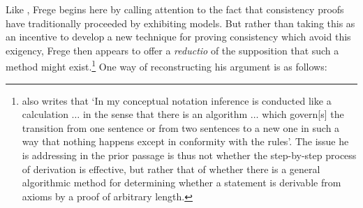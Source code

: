 \documentclass[11pt,fleqn,leqno]{article}
\begin{document}
Like \citet{Hilbert1900}, Frege begins here by calling attention to the fact that consistency proofs have traditionally proceeded by exhibiting models.  But rather than taking this as an incentive to develop a new technique for proving consistency which avoid this exigency, Frege then appears to offer a \textsl{reductio} of the supposition that such a method might exist.\footnote{\citet[p. 237]{Frege1897} also writes that `In my conceptual notation inference is conducted like a calculation $\ldots$ in the sense that there is an algorithm $\ldots$ which govern[s] the transition from one sentence or from two sentences to a new one in such a way that nothing happens except in conformity with the rules'.   The issue he is addressing in the prior passage is thus not whether the step-by-step process of derivation is effective, but rather that of whether there is a general algorithmic method for determining whether a statement is derivable from axioms by a proof of arbitrary length.} One way of reconstructing his argument is as follows:
\end{document}
